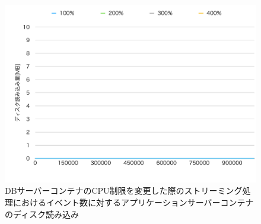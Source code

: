 \documentclass[../../../../../main]{subfiles}
\begin{document}
    \begin{figure}[H]
        \centering
        \includegraphics[width=12cm]{graph}
        \caption{DBサーバーコンテナのCPU制限を変更した際のストリーミング処理におけるイベント数に対するアプリケーションサーバーコンテナのディスク読み込み}
        \label{fig:stream-change-db-cpu-limit-app-disk-out-app_4_8192-db_1024}
    \end{figure}
\end{document}
